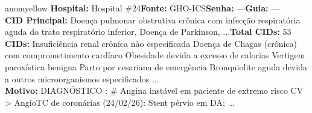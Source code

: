 \documentclass[a4paper,10pt]{article}
\begin{document}
\begin{anomalycard}[Interna\c{c}\~{a}o \#328 | Pac. \#392 | MODERADO (z=2.23) | LOS: 6d | 24/02/2026\,$\to$\,02/03/2026]{anomyellow}
\textbf{Hospital:} Hospital \#24\quad \textbf{Fonte:} GHO-ICS\quad \textbf{Senha:} ---\quad \textbf{Guia:} ---\\

\textbf{CID Principal:} {\small Doença pulmonar obstrutiva crônica com infecção respiratória aguda do trato respiratório inferior, Doença de Parkinson, ...}\quad\textbf{Total CIDs:} 53\\

\textbf{CIDs:} {\scriptsize Insuficiência renal crônica não especificada \textbar{} Doença de Chagas (crônica) com comprometimento cardíaco \textbar{} Obesidade devida a excesso de calorias \textbar{} Vertigem paroxística benigna \textbar{} Parto por cesariana de emergência \textbar{} Bronquiolite aguda devida a outros microorganismos especificados \textbar{} ...}\\

\textbf{Motivo:} {\scriptsize DIAGNÓSTICO :  \# Angina instável em paciente de extremo risco CV   \textgreater{} AngioTC de coronárias (24/02/26):   Stent pérvio em DA;   ...}\\

\end{anomalycard}
\end{document}
